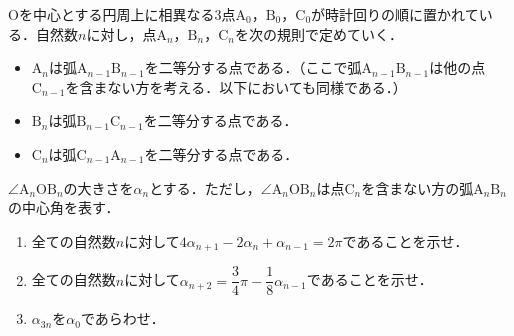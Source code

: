 \documentclass[../../main.tex]{subfiles}
\begin{document}
$\mathrm{O}$を中心とする円周上に相異なる$3$点$\mathrm{A}_0$，$\mathrm{B}_0$，$\mathrm{C}_0$が時計回りの順に置かれている．自然数$n$に対し，点$\mathrm{A}_n$，$\mathrm{B}_n$，$\mathrm{C}_n$を次の規則で定めていく．
\begin{itemize}
  \item[(イ)] $\mathrm{A}_n$は弧$\mathrm{A}_{n-1}\mathrm{B}_{n-1}$を二等分する点である．（ここで弧$\mathrm{A}_{n-1}\mathrm{B}_{n-1}$は他の点$\mathrm{C}_{n-1}$を含まない方を考える．以下においても同様である．）
  \item[(ロ)] $\mathrm{B}_n$は弧$\mathrm{B}_{n-1}\mathrm{C}_{n-1}$を二等分する点である．
  \item[(ハ)] $\mathrm{C}_n$は弧$\mathrm{C}_{n-1}\mathrm{A}_{n-1}$を二等分する点である．
\end{itemize}

$\angle \mathrm{A}_n\mathrm{OB}_n$の大きさを$\alpha_n$とする．ただし，$\angle \mathrm{A}_n\mathrm{OB}_n$は点$\mathrm{C}_n$を含まない方の弧$\mathrm{A}_n\mathrm{B}_n$の中心角を表す．

\begin{enumerate}
  \item 全ての自然数$n$に対して$4\alpha_{n+1}-2\alpha_n+\alpha_{n-1}=2\pi$であることを示せ．
  \item 全ての自然数$n$に対して$\alpha_{n+2}=\dfrac{3}{4}\pi-\dfrac{1}{8}\alpha_{n-1}$であることを示せ．
  \item $\alpha_{3n}$を$\alpha_0$であらわせ．
\end{enumerate}
\end{document}
